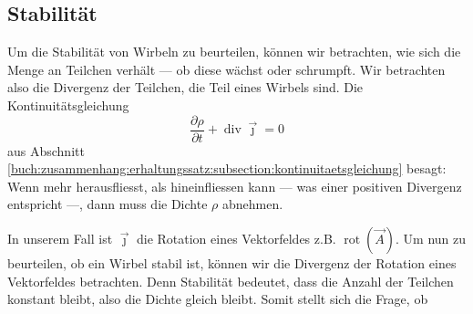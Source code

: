 \subsection{Stabilität}

Um die Stabilität von Wirbeln zu beurteilen, können wir betrachten, wie sich die Menge an Teilchen verhält --- ob diese wächst oder schrumpft. 
Wir betrachten also die Divergenz der Teilchen, die Teil eines Wirbels sind.
Die Kontinuitätsgleichung 
\[
\frac{\partial \rho}{\partial t}
+
\operatorname{div}\vec{\jmath}
=
0
\]
aus Abschnitt \ref{buch:zusammenhang:erhaltungssatz:subsection:kontinuitaetsgleichung} besagt: Wenn mehr herausfliesst, als hineinfliessen kann --- was einer positiven Divergenz entspricht ---, dann muss die Dichte \(\rho\) abnehmen.

In unserem Fall ist \(\vec{\jmath}\) die Rotation eines Vektorfeldes z.B. \(\operatorname{rot}(\vec{A})\).
Um nun zu beurteilen, ob ein Wirbel stabil ist, können wir die Divergenz der Rotation eines Vektorfeldes betrachten.
Denn Stabilität bedeutet, dass die Anzahl der Teilchen konstant bleibt, also die Dichte gleich bleibt.
Somit stellt sich die Frage, ob

